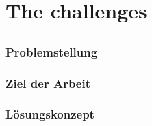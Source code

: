\part{The challenges}
\chapter{}
\label{sec:Introduction}


\section{Problemstellung}


\section{Ziel der Arbeit}



\section{Lösungskonzept}
